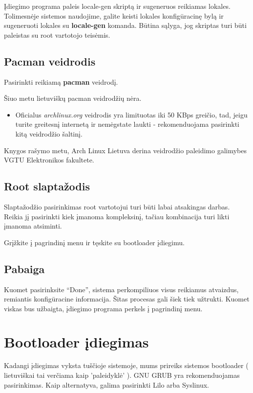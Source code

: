   Įdiegimo programa paleis locale-gen skriptą ir sugeneruos reikiamas
  lokales. Tolimesnėje sistemos naudojime, galite keisti lokales
  konfigūracinę bylą ir sugeneruoti lokales su \textbf{locale-gen}
  komanda. Būtina sąlyga, jog skriptas turi būti paleistas su root
  vartotojo teisėmis.

\subsection{Pacman veidrodis}

  Pasirinkti reikiamą \textbf{pacman} veidrodį.

  Šiuo metu lietuviškų pacman veidrodžių nėra.

  \begin{itemize}
    \item Oficialus \textsl{archlinux.org} veidrodis yra limituotas
      iki 50 KBps greičio, tad, jeigu turite greitesnį internetą ir
      nemėgstate laukti - rekomenduojama pasirinkti kitą veidrodžio šaltinį.
  \end{itemize}

  Knygos rašymo metu, Arch Linux Lietuva derina veidrodžio paleidimo
  galimybes VGTU Elektronikos fakultete.

\subsection{Root slaptažodis}

  Slaptažodžio pasirinkimas root vartotojui turi būti labai atsakingas
  darbas. Reikia jį pasirinkti kiek įmanoma kompleksinį, tačiau
  kombinacija turi likti įmanoma atsiminti.

  Grįžkite į pagrindinį menu ir tęskite su bootloader įdiegimu.

\subsection{Pabaiga}

  Kuomet pasirinksite ``Done'', sistema perkompiliuos visus reikiamus
  atvaizdus, remiantis konfigūracine informacija. Šitas procesas gali
  šiek tiek užtrukti. Kuomet viskas bus užbaigta, įdiegimo programa
  perkels į pagrindinį menu.

\section{Bootloader įdiegimas}

  Kadangi įdiegimas vyksta tuščioje sistemoje, mums prireiks sistemos
  bootloader ( lietuviškai tai verčiama kaip 'paleidyklė' ). GNU GRUB
  yra rekomenduojamas pasirinkimas. Kaip alternatyva, galima
  pasirinkti Lilo arba Syslinux.

